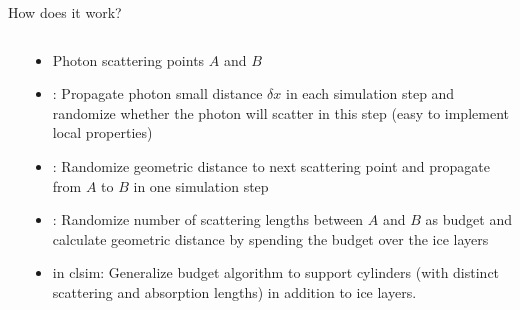 
\begin{frame}[fragile]{How does it work?}

  \begin{columns}
    \begin{column}{0.5\textwidth}
      \begin{overlayarea}{\textwidth}{\textheight}
        \vspace*{2cm}
      \end{overlayarea}
    \end{column}
    \begin{column}{0.5\textwidth}

      \begin{itemize}
        \item Photon scattering points $A$ and $B$
        \item<1> : Propagate photon small distance $\delta x$ in each simulation step and randomize whether the photon will scatter in this step (easy to implement local properties)
        \item<2> : Randomize geometric distance to next scattering point and propagate from $A$ to $B$ in one simulation step
        \item<3> : Randomize number of scattering lengths between $A$ and $B$ as budget and calculate geometric distance by spending the budget over the ice layers
        \item<4>  in clsim: Generalize budget algorithm to support cylinders (with distinct scattering and absorption lengths) in addition to ice layers.
      \end{itemize}

    \end{column}
  \end{columns}

\end{frame}